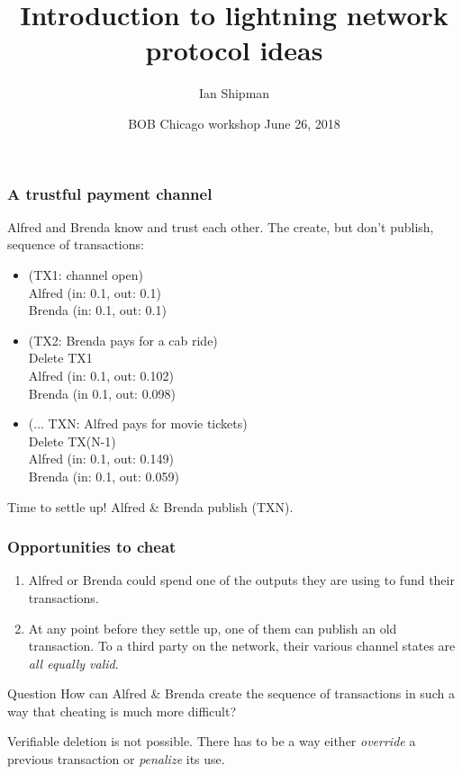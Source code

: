 \documentclass{beamer}
\title{Introduction to lightning network protocol ideas}
\author{Ian Shipman}
\date{BOB Chicago {workshop} June 26, 2018}
\begin{document}
\frame{\titlepage}
\begin{frame}
	\frametitle{A trustful payment channel}
	Alfred and Brenda know and trust each other.  The create, but don't publish, 
	sequence of transactions:
	\begin{itemize}
		\item (TX1: channel open) \\ 
			Alfred (in: 0.1, out: 0.1) \\
			Brenda (in: 0.1, out: 0.1)
		\item (TX2: Brenda pays for a cab ride) \\
			Delete TX1 \\
			Alfred (in: 0.1, out: 0.102) \\
			Brenda (in 0.1, out: 0.098)
		\item (... TXN: Alfred pays for movie tickets) \\
			Delete TX(N-1) \\ 
			Alfred (in: 0.1, out: 0.149) \\
			Brenda (in: 0.1, out: 0.059)
	\end{itemize}
	Time to settle up!  Alfred \& Brenda publish (TXN).
\end{frame}
\begin{frame}
	\frametitle{Opportunities to cheat}
	\begin{enumerate}
		\item Alfred or Brenda could spend one of the outputs they are using to 
			fund their transactions.
		\item At any point before they settle up, one of them can 
			publish an old transaction.  To a third party on the network, their 
			various channel states are \emph{all equally valid}.  
	\end{enumerate}
	\pause
	\begin{block}{Question}
		How can Alfred \& Brenda create the sequence of transactions in such a way 
		that cheating is much more difficult?
	\end{block}
	\pause
	Verifiable deletion is not possible.  There has to be a way either 
	\emph{override} a previous transaction or \emph{penalize} its use.
\end{frame}
\end{document}
